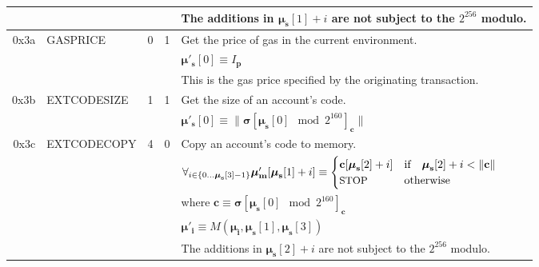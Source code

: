 \documentclass[9pt,oneside]{amsart}
\begin{document}
\begin{tabularx}{\textwidth}{rlrrX}
&&&& The additions in $\boldsymbol{\mu}_\mathbf{s}[1] + i$ are not subject to the $2^{256}$ modulo. \\
\midrule
0x3a & {\small GASPRICE} & 0 & 1 & Get the price of gas in the current environment. \\
&&&& $\boldsymbol{\mu}'_\mathbf{s}[0] \equiv I_\mathbf{p}$ \\
&&&& This is the gas price specified by the originating transaction.\\
\midrule
0x3b & {\small EXTCODESIZE} & 1 & 1 & Get the size of an account's code. \\
&&&& $\boldsymbol{\mu}'_\mathbf{s}[0] \equiv \lVert \boldsymbol{\sigma}[\boldsymbol{\mu}_\mathbf{s}[0] \mod 2^{160}]_\mathbf{c} \rVert$ \\
\midrule
0x3c & {\small EXTCODECOPY} & 4 & 0 & Copy an account's code to memory. \\
&&&& $\forall_{i \in \{ 0 \dots \boldsymbol{\mu}_\mathbf{s}[3] - 1\} } \boldsymbol{\mu}'_\mathbf{m}[\boldsymbol{\mu}_\mathbf{s}[1] + i ] \equiv
\begin{cases} \mathbf{c}[\boldsymbol{\mu}_\mathbf{s}[2] + i] & \text{if} \quad \boldsymbol{\mu}_\mathbf{s}[2] + i < \lVert \mathbf{c} \rVert \\ \text{\small STOP} & \text{otherwise} \end{cases}$\\
&&&& where $\mathbf{c} \equiv \boldsymbol{\sigma}[\boldsymbol{\mu}_\mathbf{s}[0] \mod 2^{160}]_\mathbf{c}$ \\
&&&& $\boldsymbol{\mu}'_\mathbf{i} \equiv M(\boldsymbol{\mu}_\mathbf{i}, \boldsymbol{\mu}_\mathbf{s}[1], \boldsymbol{\mu}_\mathbf{s}[3])$ \\
&&&& The additions in $\boldsymbol{\mu}_\mathbf{s}[2] + i$ are not subject to the $2^{256}$ modulo. \\
\bottomrule
\end{tabularx}
\end{document}

